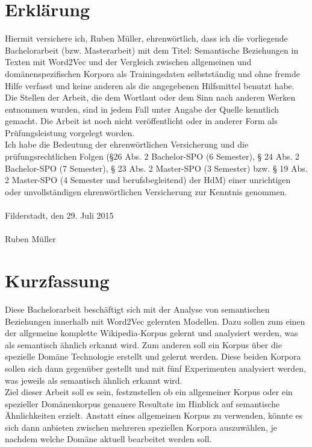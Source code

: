 \documentclass[12pt,a4paper]{report}
\begin{document}
\chapter*{Erklärung}
Hiermit versichere ich, Ruben Müller, ehrenwörtlich, dass ich die 
vorliegende Bachelorarbeit (bzw. Masterarbeit) mit dem Titel: \glqq Semantische Beziehungen in Texten mit Word2Vec und der Vergleich zwischen allgemeinen und domänenspezifischen Korpora als Trainingsdaten\grqq{} selbstständig und ohne fremde Hilfe verfasst und keine anderen als die angegebenen Hilfsmittel benutzt habe. Die Stellen der Arbeit, die dem Wortlaut oder dem Sinn nach anderen Werken entnommen wurden, sind in jedem Fall unter Angabe der Quelle kenntlich gemacht. Die Arbeit ist noch nicht veröffentlicht oder in anderer Form als Prüfungsleistung vorgelegt worden.\\
Ich habe die Bedeutung der ehrenwörtlichen Versicherung und die prüfungsrechtlichen Folgen (§26 Abs. 2 Bachelor-SPO (6 Semester), § 24 Abs. 2 Bachelor-SPO (7 Semester), § 23 Abs. 2 Master-SPO (3 Semester)  bzw. § 19 Abs. 2 Master-SPO (4 Semester und 
berufsbegleitend) der HdM) einer unrichtigen oder unvollständigen ehrenwörtlichen
Versicherung zur Kenntnis genommen.\\
\vspace{1em}\\
Filderstadt, den 29. Juli 2015\\
\vspace{5em}\\
Ruben Müller


\newpage
\chapter*{Kurzfassung}
Diese Bachelorarbeit beschäftigt sich mit der Analyse von semantischen Beziehungen innerhalb mit Word2Vec gelernten Modellen.
Dazu sollen zum einen der allgemeine komplette Wikipedia-Korpus gelernt und analysiert werden, was als semantisch ähnlich erkannt wird. Zum anderen soll ein Korpus über die spezielle Domäne Technologie erstellt und gelernt werden. Diese beiden Korpora sollen sich dann gegenüber gestellt und mit fünf Experimenten analysiert werden, was jeweils als semantisch ähnlich erkannt wird. 
\\Ziel dieser Arbeit soll es sein, festzustellen ob ein allgemeiner Korpus oder ein spezieller Domänenkorpus genauere Resultate im Hinblick auf semantische Ähnlichkeiten erzielt. Anstatt eines allgemeinen Korpus zu verwenden, könnte es sich dann anbieten zwischen mehreren speziellen Korpora auszuwählen, je nachdem welche Domäne aktuell bearbeitet werden soll.
\newpage
\end{document}
